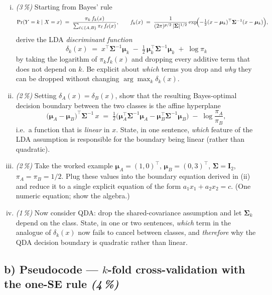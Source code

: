 \documentclass[11pt,a4paper]{article}
\newcommand{\subpoints}[1]{\textit{(#1\,\%)}}
\begin{document}
\begin{enumerate}[(i)]
  \item \subpoints{3} Starting from Bayes' rule
  $$\Pr(Y = k \mid X = x) \;=\; \frac{\pi_k\, f_k(x)}{\sum_{\ell \in \{A,B\}} \pi_\ell\, f_\ell(x)}, \qquad f_k(x) \;=\; \frac{1}{(2\pi)^{p/2}\,|\boldsymbol\Sigma|^{1/2}} \exp\!\Bigl(-\tfrac{1}{2}(x - \boldsymbol\mu_k)^\top \boldsymbol\Sigma^{-1}(x - \boldsymbol\mu_k)\Bigr),$$
  derive the LDA \emph{discriminant function}
  $$\delta_k(x) \;=\; x^\top \boldsymbol\Sigma^{-1} \boldsymbol\mu_k \;-\; \tfrac{1}{2}\,\boldsymbol\mu_k^\top \boldsymbol\Sigma^{-1} \boldsymbol\mu_k \;+\; \log \pi_k$$
  by taking the logarithm of $\pi_k f_k(x)$ and dropping every additive term that does not depend on $k$. Be explicit about \emph{which} terms you drop and \emph{why} they can be dropped without changing $\arg\max_k \delta_k(x)$.

  \item \subpoints{2} Setting $\delta_A(x) = \delta_B(x)$, show that the resulting Bayes-optimal decision boundary between the two classes is the affine hyperplane
  $$\bigl(\boldsymbol\mu_A - \boldsymbol\mu_B\bigr)^\top \boldsymbol\Sigma^{-1}\, x \;=\; \tfrac{1}{2}\bigl(\boldsymbol\mu_A^\top \boldsymbol\Sigma^{-1} \boldsymbol\mu_A - \boldsymbol\mu_B^\top \boldsymbol\Sigma^{-1} \boldsymbol\mu_B\bigr) \;-\; \log\frac{\pi_A}{\pi_B},$$
  i.e.\ a function that is \emph{linear} in $x$. State, in one sentence, \emph{which} feature of the LDA assumption is responsible for the boundary being linear (rather than quadratic).

  \item \subpoints{2} Take the worked example $\boldsymbol\mu_A = (1,0)^\top$, $\boldsymbol\mu_B = (0,3)^\top$, $\boldsymbol\Sigma = \mathbf{I}_2$, $\pi_A = \pi_B = 1/2$. Plug these values into the boundary equation derived in (ii) and reduce it to a single explicit equation of the form $a_1 x_1 + a_2 x_2 = c$. (One numeric equation; show the algebra.)

  \item \subpoints{1} Now consider QDA: drop the shared-covariance assumption and let $\boldsymbol\Sigma_k$ depend on the class. State, in one or two sentences, \emph{which} term in the analogue of $\delta_k(x)$ now fails to cancel between classes, and \emph{therefore} why the QDA decision boundary is quadratic rather than linear.
\end{enumerate}

\subsection*{b) Pseudocode --- $k$-fold cross-validation with the one-SE rule \subpoints{4}}
\end{document}
